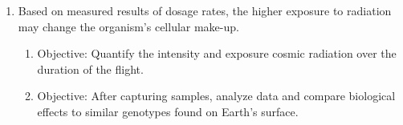 \begin{enumerate}
\item Based on measured results of dosage rates, the higher exposure to radiation may change the organism's cellular make-up.
	\begin{enumerate}
	\item Objective: Quantify the intensity and exposure cosmic radiation over the duration of the flight.
	\item Objective: After capturing samples, analyze data and compare biological effects to similar genotypes found on Earth's surface.
	\end{enumerate}
\end{enumerate}

\vspace*{-0.5cm}
